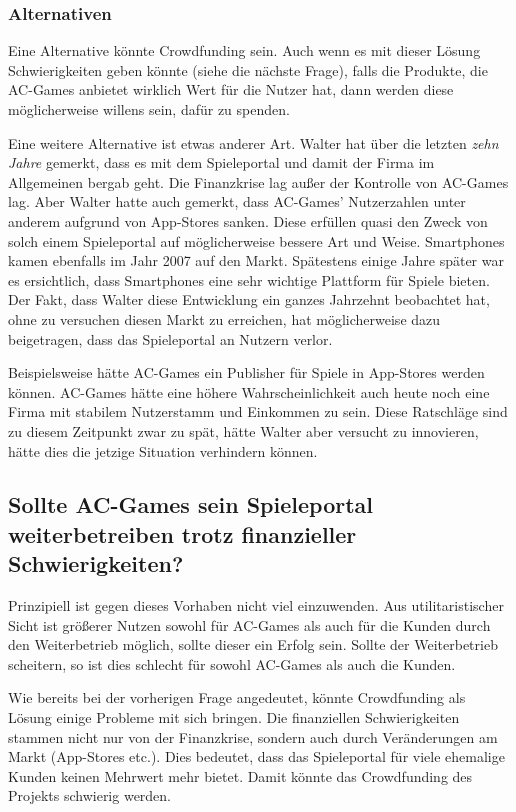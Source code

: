 \subsubsection*{Alternativen}

Eine Alternative könnte Crowdfunding sein. 
Auch wenn es mit dieser Lösung Schwierigkeiten geben könnte (siehe die nächste Frage),
falls die Produkte, die AC-Games anbietet wirklich Wert für die Nutzer hat, dann werden diese möglicherweise willens sein, dafür zu spenden.

Eine weitere Alternative ist etwas anderer Art.
Walter hat über die letzten \emph{zehn Jahre} gemerkt, dass es mit dem Spieleportal und damit der Firma im Allgemeinen bergab geht.
Die Finanzkrise lag außer der Kontrolle von AC-Games lag. Aber Walter hatte auch gemerkt, 
dass AC-Games' Nutzerzahlen unter anderem aufgrund von App-Stores sanken. 
Diese erfüllen quasi den Zweck von solch einem Spieleportal auf möglicherweise bessere Art und Weise.
Smartphones kamen ebenfalls im Jahr 2007 auf den Markt.
Spätestens einige Jahre später war es ersichtlich, dass Smartphones eine sehr wichtige Plattform für Spiele bieten.
Der Fakt, dass Walter diese Entwicklung ein ganzes Jahrzehnt beobachtet hat, ohne zu versuchen diesen Markt zu erreichen, 
hat möglicherweise dazu beigetragen, dass das Spieleportal an Nutzern verlor.

Beispielsweise hätte AC-Games ein Publisher für Spiele in App-Stores werden können.
AC-Games hätte eine höhere Wahrscheinlichkeit auch heute noch eine Firma mit stabilem Nutzerstamm und Einkommen zu sein.
Diese Ratschläge sind zu diesem Zeitpunkt zwar zu spät, hätte Walter aber versucht zu innovieren, hätte dies die jetzige Situation verhindern können.

\subsection{Sollte AC-Games sein Spieleportal weiterbetreiben trotz finanzieller Schwierigkeiten? \cite{kees_faites_2017}}

Prinzipiell ist gegen dieses Vorhaben nicht viel einzuwenden.
Aus utilitaristischer Sicht ist größerer Nutzen sowohl für AC-Games als auch für die Kunden durch den Weiterbetrieb möglich, sollte dieser ein Erfolg sein.
Sollte der Weiterbetrieb scheitern, so ist dies schlecht für sowohl AC-Games als auch die Kunden.

Wie bereits bei der vorherigen Frage angedeutet, könnte Crowdfunding als Lösung einige Probleme mit sich bringen.
Die finanziellen Schwierigkeiten stammen nicht nur von der Finanzkrise, sondern auch durch Veränderungen am Markt (App-Stores etc.).
Dies bedeutet, dass das Spieleportal für viele ehemalige Kunden keinen Mehrwert mehr bietet.
Damit könnte das Crowdfunding des Projekts schwierig werden. 

